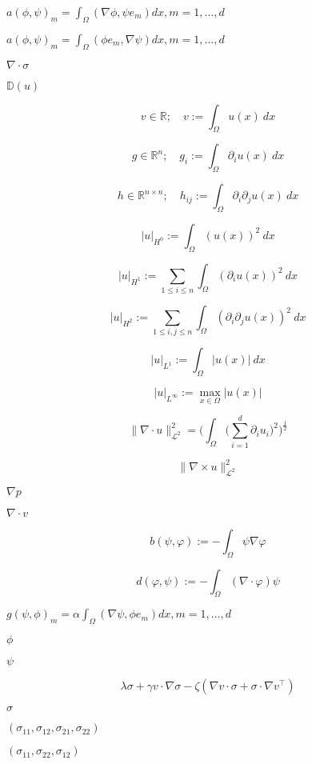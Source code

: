 \documentclass{article}
\begin{document}
$ a(\phi, \psi)_m = \int_\Omega(\nabla \phi, \psi e_m) dx, m=1,\dots,d $
\pagebreak

$ a(\phi, \psi)_m = \int_\Omega(\phi e_m, \nabla \psi) dx, m=1,\dots,d $
\pagebreak

$\nabla\cdot\sigma$
\pagebreak

$\mathbb{D}(u)$
\pagebreak

\[v \in\mathbb{R};\quad v := \int_\Omega u(x)~dx \]
\pagebreak

\[g \in\mathbb{R}^n;\quad g_i := \int_\Omega \partial_i u(x)~dx \]
\pagebreak

\[h \in\mathbb{R}^{n\times n};\quad h_{ij} := \int_\Omega \partial_i\partial_j u(x)~dx \]
\pagebreak

\[|u|_{H^0} := \int_\Omega (u(x))^2~dx \]
\pagebreak

\[|u|_{H^1} := \sum_{1\leq i\leq n}\int_\Omega (\partial_i u(x))^2~dx \]
\pagebreak

\[|u|_{H^2} := \sum_{1\leq i,j\leq n}\int_\Omega (\partial_i \partial_j u(x))^2~dx \]
\pagebreak

\[|u|_{L^1} := \int_\Omega |u(x)|~dx \]
\pagebreak

\[|u|_{L^\infty} := \max_{x\in\Omega} |u(x)| \]
\pagebreak

\[ \| \nabla \cdot u\|_{\mathcal{L}^2}^2 = \Big(\int_\Omega \big(\sum_{i=1}^d \partial_i u_i\big)^2\Big)^{\frac{1}{2}}\]
\pagebreak

\[ \| \nabla \times u\|_{\mathcal{L}^2}^2 \]
\pagebreak

$\nabla p$
\pagebreak

$\nabla\cdot v$
\pagebreak

\[ b(\psi,\varphi) := - \int_\Omega \psi \nabla \varphi\]
\pagebreak

\[ d(\varphi,\psi) := - \int_\Omega (\nabla \cdot \varphi) \psi\]
\pagebreak

$ g(\psi, \phi)_m = \alpha \int_\Omega(\nabla \psi, \phi e_m) dx, m=1,\dots,d $
\pagebreak

$ \phi $
\pagebreak

$ \psi $
\pagebreak

\[ \lambda\sigma + \gamma v\cdot\nabla\sigma - \zeta(\nabla v\cdot\sigma + \sigma\cdot\nabla v^\top)\]
\pagebreak

$\sigma$
\pagebreak

$(\sigma_{11}, \sigma_{12}, \sigma_{21}, \sigma_{22})$
\pagebreak

$(\sigma_{11}, \sigma_{22}, \sigma_{12})$
\pagebreak
\end{document}
